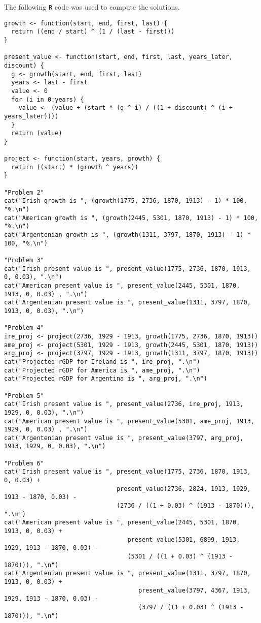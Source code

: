 \documentclass[12pt,letterpaper]{article}
\theoremstyle{definition}
\begin{document}
The following \verb!R! code was used to compute the solutions. 

\begin{scriptsize}
\begin{verbatim}
growth <- function(start, end, first, last) {
  return ((end / start) ^ (1 / (last - first)))
}

present_value <- function(start, end, first, last, years_later, discount) {
  g <- growth(start, end, first, last)
  years <- last - first
  value <- 0
  for (i in 0:years) {
    value <- (value + (start * (g ^ i) / ((1 + discount) ^ (i + years_later))))
  }
  return (value)
}

project <- function(start, years, growth) {
  return ((start) * (growth ^ years))
}

"Problem 2"
cat("Irish growth is ", (growth(1775, 2736, 1870, 1913) - 1) * 100, "%.\n")
cat("American growth is ", (growth(2445, 5301, 1870, 1913) - 1) * 100, "%.\n")
cat("Argentenian growth is ", (growth(1311, 3797, 1870, 1913) - 1) * 100, "%.\n")

"Problem 3"
cat("Irish present value is ", present_value(1775, 2736, 1870, 1913, 0, 0.03), ".\n")
cat("American present value is ", present_value(2445, 5301, 1870, 1913, 0, 0.03) , ".\n")
cat("Argentenian present value is ", present_value(1311, 3797, 1870, 1913, 0, 0.03), ".\n")

"Problem 4"
ire_proj <- project(2736, 1929 - 1913, growth(1775, 2736, 1870, 1913))
ame_proj <- project(5301, 1929 - 1913, growth(2445, 5301, 1870, 1913))
arg_proj <- project(3797, 1929 - 1913, growth(1311, 3797, 1870, 1913))
cat("Projected rGDP for Ireland is ", ire_proj, ".\n")
cat("Projected rGDP for America is ", ame_proj, ".\n")
cat("Projected rGDP for Argentina is ", arg_proj, ".\n")

"Problem 5"
cat("Irish present value is ", present_value(2736, ire_proj, 1913, 1929, 0, 0.03), ".\n")
cat("American present value is ", present_value(5301, ame_proj, 1913, 1929, 0, 0.03) , ".\n")
cat("Argentenian present value is ", present_value(3797, arg_proj, 1913, 1929, 0, 0.03), ".\n")

"Problem 6"
cat("Irish present value is ", present_value(1775, 2736, 1870, 1913, 0, 0.03) +
                               present_value(2736, 2824, 1913, 1929, 1913 - 1870, 0.03) -
                               (2736 / ((1 + 0.03) ^ (1913 - 1870))), ".\n")
cat("American present value is ", present_value(2445, 5301, 1870, 1913, 0, 0.03) +
                                  present_value(5301, 6899, 1913, 1929, 1913 - 1870, 0.03) -
                                  (5301 / ((1 + 0.03) ^ (1913 - 1870))), ".\n")
cat("Argentenian present value is ", present_value(1311, 3797, 1870, 1913, 0, 0.03) +
                                     present_value(3797, 4367, 1913, 1929, 1913 - 1870, 0.03) -
                                     (3797 / ((1 + 0.03) ^ (1913 - 1870))), ".\n")

\end{verbatim}
\end{scriptsize}
\end{document}
